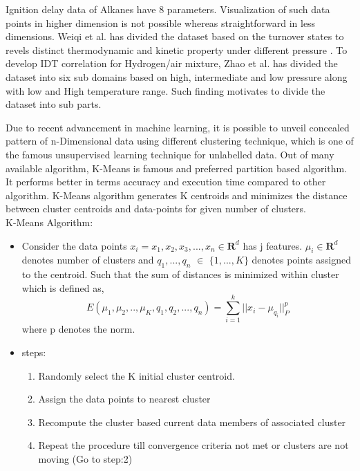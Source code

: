 \documentclass[preprint,12pt]{elsarticle}
\begin{document}
					Ignition delay data of Alkanes have 8 parameters. Visualization of such data points in higher dimension is not possible  whereas  straightforward in less dimensions. Weiqi et al. has divided the dataset based on the turnover states to revels distinct thermodynamic and kinetic property under different pressure \cite{controlling}. To develop IDT correlation for Hydrogen/air mixture, Zhao et al. \cite{zhao2011correlations} has divided the dataset into six sub domains based on high, intermediate and low pressure along with low and High temperature range. Such finding motivates to divide the dataset into sub parts.
					
					Due to recent advancement in machine learning, it is possible to unveil concealed pattern of n-Dimensional data using different clustering technique, which is one of the famous unsupervised learning technique for unlabelled data. Out of many available algorithm, K-Means is famous and  preferred partition based algorithm. It performs better in terms accuracy and execution time compared to other algorithm\cite{clustering}. K-Means algorithm generates K centroids and minimizes the distance between cluster centroids and data-points for given number of clusters.\\
					
					K-Means Algorithm:
					\begin{itemize}
						\item Consider the data points $x_i= {x_1, x_2, x_3, ... , x_n} \in \mathbf {R}^d $  has j features. $\mu_i \in \mathbf {R}^d$ denotes number of clusters and $q_1, ... ,q_n$ $\in$ $\{1, ... , K\}$ denotes points assigned to the centroid. Such that the sum of distances 
						 is minimized within cluster which is defined as,
						\begin{equation}
 E (\mu_1, \mu_2,.., \mu_K, q_1, q_2, ... ,q_n) =  \sum_{i=1}^{k} ||x_i - \mu_{q_i} ||^p_P
						\end{equation}
						where p denotes the norm.
						\item {steps:} 
						\begin{enumerate}
							\item Randomly select the K initial cluster centroid.
							\item Assign the data points to nearest cluster 
							\item Recompute the  cluster based current data members of associated cluster
							\item Repeat the procedure till convergence criteria not met or clusters are not moving (Go to step:2) 
						\end{enumerate}
					\end{itemize} 
					
\end{document}

